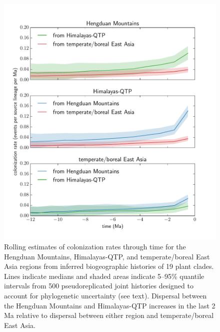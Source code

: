 \documentclass[9pt,twocolumn,twoside,lineno]{pnas-new}
\begin{document}
\begin{figure}
\centering
\includegraphics[width=.99\linewidth]{dispersal_rates.pdf}
\caption{Rolling estimates of colonization rates through time for the
  Hengduan Mountains, Himalayas-QTP, and temperate/boreal East Asia
  regions from inferred biogeographic histories of 19 plant
  clades. Lines indicate medians and shaded areas indicate 5–95\%
  quantile intervals from 500 pseudoreplicated joint histories
  designed to account for phylogenetic uncertainty (see
  text). Dispersal between the Hengduan Mountains and Himalayas-QTP
  increases in the last 2 Ma relative to dispersal between either
  region and temperate/boreal East Asia.}
\label{fig:dispersal}
\end{figure}
\end{document}
